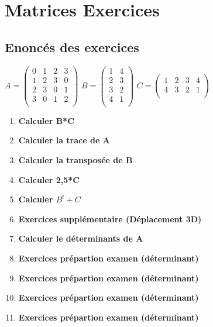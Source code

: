 
\newpage
\chapter{Matrices Exercices}
\vspace{10mm} %
\section{Enoncés des exercices}
\vspace{5mm} %

$
A =
\begin{pmatrix}
  0 & 1 & 2 & 3 \\
  1 & 2 & 3 & 0 \\
  2 & 3 & 0 & 1 \\
  3 & 0 & 1 & 2 \\
\end{pmatrix}
$
\vspace{3mm} %
$
B =
\begin{pmatrix}
  1 & 4 \\
  2 & 3 \\
  3 & 2 \\
  4 & 1 \\
\end{pmatrix}
$
\vspace{3mm} %
$
C =
\begin{pmatrix}
  1 & 2 & 3 & 4 \\
  4 & 3 & 2 & 1 \\
\end{pmatrix}
$

\begin{enumerate}[label=\Alph*)]
\item \textbf{Calculer B*C}
\item \textbf{Calculer la trace de A}
\item \textbf{Calculer la transposée de B}
\item \textbf{Calculer 2,5*C}
\item \textbf{Calculer $B^{t}+C$}
\item \textbf{Exercices supplémentaire (Déplacement 3D)}
\item \textbf{Calculer le déterminants de A}
\item \textbf{Exercices prépartion examen (déterminant)}
\item \textbf{Exercices prépartion examen (déterminant)}
\item \textbf{Exercices prépartion examen (déterminant)}
\item \textbf{Exercices prépartion examen (déterminant)}
\end{enumerate}

